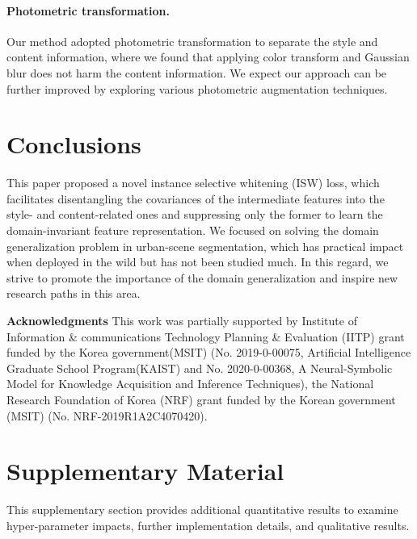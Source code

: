 \documentclass[final]{latex/cvpr}
\begin{document}
\paragraph{Photometric transformation.} Our method adopted photometric transformation to separate the style and content information, where we found that applying color transform and Gaussian blur does not harm the content information. We expect our approach can be further improved by exploring various photometric augmentation techniques.

\vspace{-0.1cm}
\section{Conclusions}
\vspace{-0.1cm}
This paper proposed a novel instance selective whitening (ISW) loss, which facilitates disentangling the covariances of the intermediate features into the style- and content-related ones and suppressing only the former to learn the domain-invariant feature representation.
We focused on solving the domain generalization problem in urban-scene segmentation, which has practical impact when deployed in the wild but has not been studied much. 
In this regard, we strive to promote the importance of the domain generalization and inspire new research paths in this area.


\vspace*{0.15cm}
{
\small
\noindent\textbf{Acknowledgments}
This work was partially supported by Institute of Information \& communications Technology Planning \& Evaluation (IITP) grant funded by the Korea government(MSIT) (No. 2019-0-00075, Artificial Intelligence Graduate School Program(KAIST) and No. 2020-0-00368, A Neural-Symbolic Model for Knowledge Acquisition and Inference Techniques), the National Research Foundation of Korea (NRF) grant funded by the Korean government (MSIT) (No. NRF-2019R1A2C4070420).
}


\clearpage
{\small


}
\clearpage
\def\thesection{\Alph{section}}
\setcounter{section}{0}
\section{Supplementary Material} \label{supple}
\vspace{-0.1cm}
This supplementary section provides additional quantitative results to examine hyper-parameter impacts, further implementation details, and qualitative results. 
\end{document}
